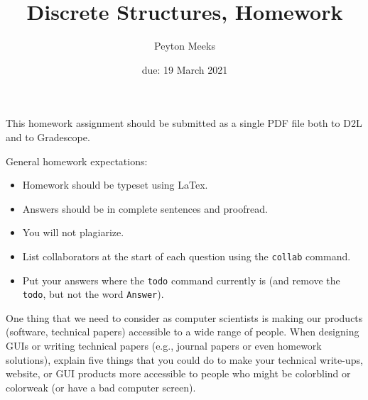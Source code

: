 \documentclass{article}
\title{Discrete Structures, Homework \hwnum}
\author{Peyton Meeks}
\date{due: 19 March 2021}
\begin{document}
\maketitle

This homework assignment should be
submitted as a single PDF file both to D2L and to Gradescope.

General homework expectations:
\begin{itemize}
    \item Homework should be typeset using LaTex.
    \item Answers should be in complete sentences and proofread.
    \item You will not plagiarize.
    \item List collaborators at the start of each question using the \texttt{collab} command.
    \item Put your answers where the \texttt{todo} command currently is (and
        remove the \texttt{todo}, but not the word \texttt{Answer}).
\end{itemize}


 

One thing that we need to consider as computer scientists is making our products
(software, technical papers) accessible to a wide range of people. When
designing GUIs or writing technical papers (e.g., journal papers or even
homework solutions), explain five things that you could do to make your
technical write-ups, website, or GUI products more accessible to people who
might be colorblind or colorweak (or have a bad computer screen).
\end{document}

